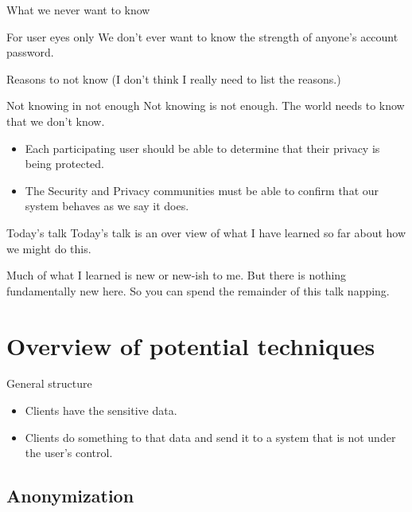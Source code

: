 \documentclass[xcolor={dvipsnames,table,hyperref}]{beamer}
\begin{document}
\begin{frame}{What we never want to know}
  \begin{alertblock}{For user eyes only}
    We don't ever want to know the strength of anyone's account password.
  \end{alertblock}
\end{frame}

\begin{frame}{Reasons to not know}
  (I don't think I really need to list the reasons.)
\end{frame}

\begin{frame}{Not knowing in not enough}
  Not knowing is not enough. The world needs to know that we don't know.
  \begin{itemize}
    \item Each participating user should be able to determine that their privacy is being protected.
    \item The Security and Privacy communities must be able to confirm that our system behaves as we say it does.
  \end{itemize}

\end{frame}

\begin{frame}{Today's talk}
  Today's talk is an over view of what I have learned so far about how we might do this.

  Much of what I learned is new or new-ish to me. But there is nothing fundamentally new here. So you can spend the remainder of this talk napping.

\end{frame}

\section{Overview of potential techniques}

\begin{frame}{General structure}
  \begin{itemize}
    \item Clients have the sensitive data.
    \item Clients do something to that data and send it to a system that is not under the user's control.
  \end{itemize}
\end{frame}

\subsection{Anonymization}
\end{document}
